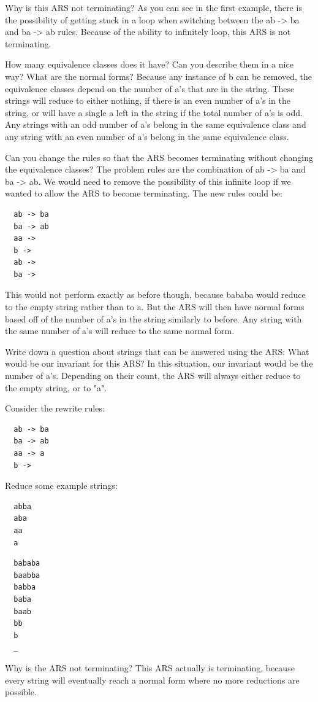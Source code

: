 \documentclass{article}
\theoremstyle{theorem}
\theoremstyle{definition}
\theoremstyle{remark}
\begin{document}
Why is this ARS not terminating?
As you can see in the first example, there is the possibility 
of getting stuck in a loop when switching between the ab -> ba 
and ba -> ab rules. Because of the ability to infinitely loop, this
ARS is not terminating. 

How many equivalence classes does it have? Can you describe them in a nice way? What are the normal forms?
Because any instance of b can be removed, the equivalence classes 
depend on the number of a's that are in the string. These strings will 
reduce to either nothing, if there is an even number of a's in the string, or will have a single a 
left in the string if the total number of a's is odd. Any strings with an odd number of a's belong 
in the same equivalence class and any string with an even number of a's belong in the 
same equivalence class. 

Can you change the rules so that the ARS becomes terminating without 
changing the equivalence classes?
The problem rules are the combination of ab -> ba and ba -> ab. We would 
need to remove the possibility of this infinite loop if we wanted to allow 
the ARS to become terminating. The new rules could be:
\begin{verbatim}
  ab -> ba
  ba -> ab
  aa -> 
  b -> 
  ab ->
  ba ->
\end{verbatim}
This would not perform exactly as before though, because bababa would reduce 
to the empty string rather than to a. But the ARS will then have normal forms based off
of the number of a's in the string similarly to before. Any string with the same 
number of a's will reduce to the same normal form.

Write down a question about strings that can be answered using the ARS:
What would be our invariant for this ARS?
In this situation, our invariant would be the number of a's. Depending on their count, the
ARS will always either reduce to the empty string, or to "a".

Consider the rewrite rules:
\begin{verbatim}
  ab -> ba
  ba -> ab
  aa -> a
  b ->
\end{verbatim}
Reduce some example strings:
\begin{verbatim}
  abba
  aba 
  aa 
  a
\end{verbatim}
\begin{verbatim}
  bababa
  baabba 
  babba 
  baba 
  baab 
  bb 
  b 
  _
\end{verbatim}
Why is the ARS not terminating?
This ARS actually is terminating, because every string will eventually 
reach a normal form where no more reductions are possible. 
\end{document}
